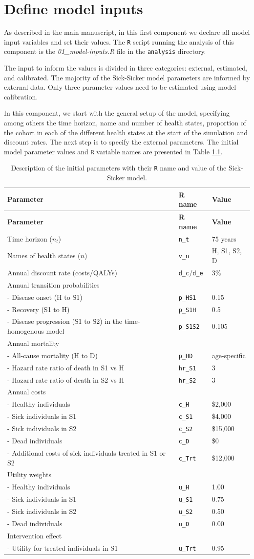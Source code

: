 \documentclass[]{book}
\begin{document}
\chapter{Define model inputs}\label{inputs}

As described in the main manuscript, in this first component we declare
all model input variables and set their values. The \texttt{R} script
running the analysis of this component is the \emph{01\_model-inputs.R}
file in the \texttt{analysis} directory.

The input to inform the values is divided in three categories: external,
estimated, and calibrated. The majority of the Sick-Sicker model
parameters are informed by external data. Only three parameter values
need to be estimated using model calibration.

In this component, we start with the general setup of the model,
specifying among others the time horizon, name and number of health
states, proportion of the cohort in each of the different health states
at the start of the simulation and discount rates. The next step is to
specify the external parameters. The initial model parameter values and
\texttt{R} variable names are presented in Table \ref{tab:parameters}.

\begin{longtable}[]{@{}lll@{}}
\caption{\label{tab:parameters} Description of the initial parameters with
their \texttt{R} name and value of the Sick-Sicker
model.}\tabularnewline
\toprule
\textbf{Parameter} & \textbf{R name} & \textbf{Value}\tabularnewline
\midrule
\endfirsthead
\toprule
\textbf{Parameter} & \textbf{R name} & \textbf{Value}\tabularnewline
\midrule
\endhead
Time horizon (\(n_t\)) & \texttt{n\_t} & 75 years\tabularnewline
Names of health states (\(n\)) & \texttt{v\_n} & H, S1, S2,
D\tabularnewline
Annual discount rate (costs/QALYs) & \texttt{d\_c}/\texttt{d\_e} &
3\%\tabularnewline
Annual transition probabilities & &\tabularnewline
- Disease onset (H to S1) & \texttt{p\_HS1} & 0.15\tabularnewline
- Recovery (S1 to H) & \texttt{p\_S1H} & 0.5\tabularnewline
- Disease progression (S1 to S2) in the time-homogenous model &
\texttt{p\_S1S2} & 0.105\tabularnewline
Annual mortality & &\tabularnewline
- All-cause mortality (H to D) & \texttt{p\_HD} &
age-specific\tabularnewline
- Hazard rate ratio of death in S1 vs H & \texttt{hr\_S1} &
3\tabularnewline
- Hazard rate ratio of death in S2 vs H & \texttt{hr\_S2} &
3\tabularnewline
Annual costs & &\tabularnewline
- Healthy individuals & \texttt{c\_H} & \$2,000\tabularnewline
- Sick individuals in S1 & \texttt{c\_S1} & \$4,000\tabularnewline
- Sick individuals in S2 & \texttt{c\_S2} & \$15,000\tabularnewline
- Dead individuals & \texttt{c\_D} & \$0\tabularnewline
- Additional costs of sick individuals treated in S1 or S2 &
\texttt{c\_Trt} & \$12,000\tabularnewline
Utility weights & &\tabularnewline
- Healthy individuals & \texttt{u\_H} & 1.00\tabularnewline
- Sick individuals in S1 & \texttt{u\_S1} & 0.75\tabularnewline
- Sick individuals in S2 & \texttt{u\_S2} & 0.50\tabularnewline
- Dead individuals & \texttt{u\_D} & 0.00\tabularnewline
Intervention effect & &\tabularnewline
- Utility for treated individuals in S1 & \texttt{u\_Trt} &
0.95\tabularnewline
\bottomrule
\end{longtable}
\end{document}
